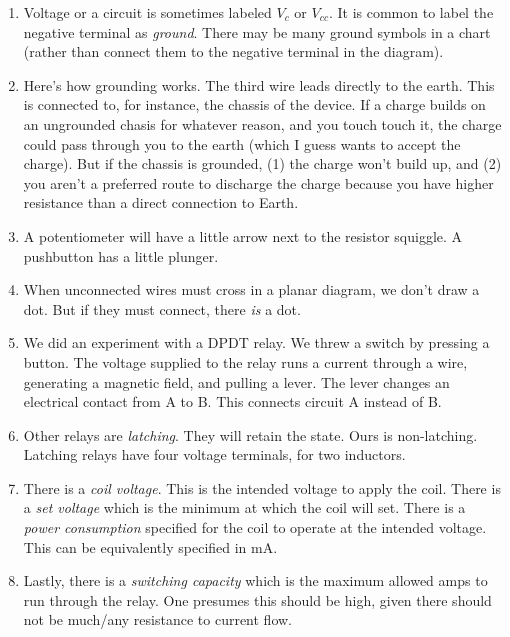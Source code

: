 \documentclass[11pt, oneside]{amsart}
\begin{document}
\begin{enumerate}
  \item Voltage or a circuit is sometimes labeled $V_c$ or $V_{cc}$. It
  is common to label the negative terminal as \emph{ground}. There may
  be many ground symbols in a chart (rather than connect them to the
  negative terminal in the diagram).

  \item Here's how grounding works. The third wire leads directly to the
  earth. This is connected to, for instance, the chassis of the device.
  If a charge builds on an ungrounded chasis for whatever reason, and
  you touch touch it, the charge could pass through you to the earth
  (which I guess wants to accept the charge). But if the chassis is
  grounded, (1) the charge won't build up, and (2) you aren't a
  preferred route to discharge the charge because you have higher
  resistance than a direct connection to Earth.

  \item A potentiometer will have a little arrow next to the resistor
  squiggle. A pushbutton has a little plunger.

  \item When unconnected wires must cross in a planar diagram, we don't
  draw a dot. But if they must connect, there \emph{is} a dot.

  \item We did an experiment with a DPDT relay. We threw a switch by
  pressing a button. The voltage supplied to the relay runs a current
  through a wire, generating a magnetic field, and pulling a lever. The
  lever changes an electrical contact from A to B. This connects circuit
  A instead of B.

  \item Other relays are \emph{latching}. They will retain the state.
  Ours is non-latching. Latching relays have four voltage terminals, for
  two inductors.

  \item There is a \emph{coil voltage}. This is the intended voltage to
  apply the coil. There is a \emph{set voltage} which is the minimum at
  which the coil will set. There is a \emph{power consumption} specified
  for the coil to operate at the intended voltage. This can be
  equivalently specified in mA.

  \item Lastly, there is a \emph{switching capacity} which is the
  maximum allowed amps to run through the relay. One presumes this
  should be high, given there should not be much/any resistance to
  current flow.


\end{enumerate}
\end{document}
